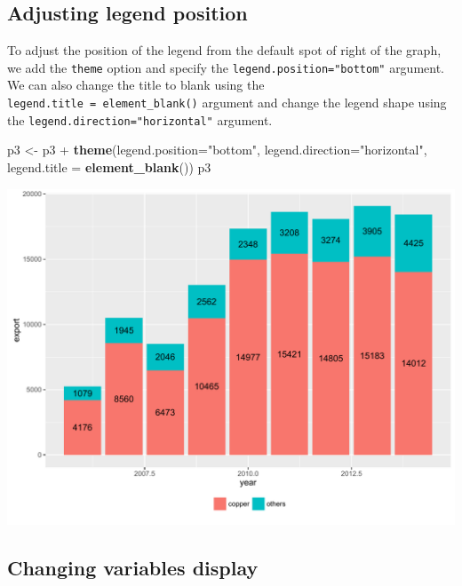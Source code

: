\documentclass[]{article}
\newenvironment{Shaded}{\begin{snugshade}}{\end{snugshade}}
\newcommand{\KeywordTok}[1]{\textcolor[rgb]{0.13,0.29,0.53}{\textbf{{#1}}}}
\newcommand{\DataTypeTok}[1]{\textcolor[rgb]{0.13,0.29,0.53}{{#1}}}
\newcommand{\StringTok}[1]{\textcolor[rgb]{0.31,0.60,0.02}{{#1}}}
\newcommand{\NormalTok}[1]{{#1}}
\begin{document}
\subsection{Adjusting legend
position}\label{adjusting-legend-position-1}

To adjust the position of the legend from the default spot of right of
the graph, we add the \texttt{theme} option and specify the
\texttt{legend.position="bottom"} argument. We can also change the title
to blank using the \texttt{legend.title\ =\ element\_blank()} argument
and change the legend shape using the
\texttt{legend.direction="horizontal"} argument.

\begin{Shaded}
\begin{Highlighting}[]
\NormalTok{p3 <-}\StringTok{ }\NormalTok{p3 +}\StringTok{ }\KeywordTok{theme}\NormalTok{(}\DataTypeTok{legend.position=}\StringTok{"bottom"}\NormalTok{, }\DataTypeTok{legend.direction=}\StringTok{"horizontal"}\NormalTok{, }
                 \DataTypeTok{legend.title =} \KeywordTok{element_blank}\NormalTok{())}
\NormalTok{p3}
\end{Highlighting}
\end{Shaded}

\begin{center}\includegraphics{0_all_posts_pdf/bar_4-1} \end{center}

\subsection{Changing variables
display}\label{changing-variables-display-2}
\end{document}
